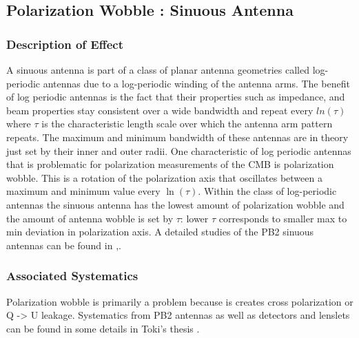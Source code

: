 \subsection{Polarization Wobble : Sinuous Antenna}

\subsubsection{Description of Effect}
A sinuous antenna is part of a class of planar antenna geometries called log-periodic antennas due to a log-periodic winding of the antenna arms. The benefit of log periodic antennas is the fact that their properties such as impedance, and beam properties stay consistent over a wide bandwidth and repeat every $ln(\tau)$ where $\tau$ is the characteristic length scale over which the antenna arm pattern repeats. The maximum and minimum bandwidth of these antennas are in theory just set by their inner and outer radii. One characteristic of log periodic antennas that is problematic for polarization measurements of the CMB is polarization wobble. This is a rotation of the polarization axis that oscillates between a maximum and minimum value every $\ln(\tau)$. Within the class of log-periodic antennas the sinuous antenna has the lowest amount of polarization wobble and the amount of antenna wobble is set by $\tau$: lower $\tau$ corresponds to smaller max to min deviation in polarization axis. A detailed studies of the PB2 sinuous antennas can be found in \cite{Obrient2008},\cite{Edwards2012}.
\subsubsection{Associated Systematics}
Polarization wobble is primarily a problem because is creates cross polarization or Q -> U leakage. Systematics from PB2 antennas as well as detectors and lenslets can be found in some details in Toki's thesis \cite{TokiThesis}.

